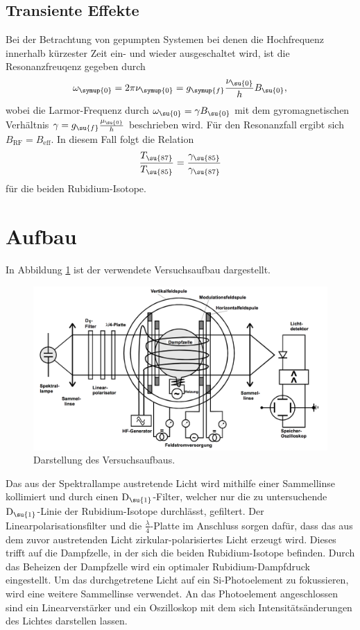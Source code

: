 \subsection{Transiente Effekte}
Bei der Betrachtung von gepumpten Systemen bei denen die Hochfrequenz innerhalb kürzester Zeit ein- und wieder ausgeschaltet wird,
ist die Resonanzfreuqenz gegeben durch
\begin{align*}
    \omega_{\symup{0}} = 2 \pi \nu_{\symup{0}} = g_{\symup{f}} \frac{\nu_{\su{0}}}{h} B_{\su{0}},
\end{align*}
wobei die Larmor-Frequenz durch $\omega_{\su{0}} = \gamma B_{\su{0}}$ mit dem gyromagnetischen Verhältnis
$\gamma = g_{\su{f}} \frac{\mu_{\su{0}}}{h}$ beschrieben wird.
Für den Resonanzfall ergibt sich $B_{\text{RF}} = B_{\text{eff}}$.
\newline
In diesem Fall folgt die Relation
\begin{align*}
    \frac{T_{\su{87}}}{T_{\su{85}}} = \frac{\gamma_{\su{85}}}{\gamma_{\su{87}}}
\end{align*}
für die beiden Rubidium-Isotope.

\newpage
\section{Aufbau}
In Abbildung \ref{fig:aufbau} ist der verwendete Versuchsaufbau dargestellt.
\begin{figure}
    \centering
    \includegraphics[scale = 0.4]{pictures/aufbau.png}
    \caption{Darstellung des Versuchsaufbaus.\cite{1}}
    \label{fig:aufbau}
\end{figure}
\newline
Das aus der Spektrallampe austretende Licht wird mithilfe einer Sammellinse kollimiert und durch einen $\text{D}_{\su{1}}$-Filter,
welcher nur die zu untersuchende $\text{D}_{\su{1}}$-Linie der Rubidium-Isotope durchlässt, gefiltert.
Der Linearpolarisationsfilter und die $\frac{\lambda}{4}$-Platte im Anschluss sorgen dafür, dass das
aus dem zuvor austretenden Licht zirkular-polarisiertes Licht erzeugt wird. Dieses trifft auf die Dampfzelle, in der
sich die beiden Rubidium-Isotope befinden. Durch das Beheizen der Dampfzelle wird ein optimaler Rubidium-Dampfdruck
eingestellt. Um das durchgetretene Licht auf ein Si-Photoelement zu fokussieren, wird
eine weitere Sammellinse verwendet. An das Photoelement angeschlossen sind ein Linearverstärker
und ein Oszilloskop mit dem sich Intensitätsänderungen des Lichtes darstellen lassen.

